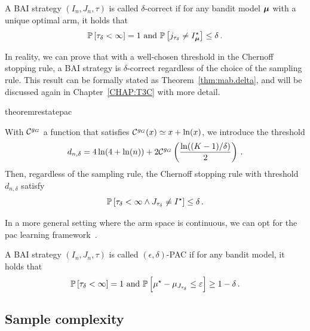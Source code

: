 \begin{definition}\label{def:mab.delta}
\begin{leftbar}[defnbar]
A BAI strategy $(I_n,J_n,\tau)$ is called $\delta$-correct if for any bandit model ${\boldsymbol \mu}$ with a unique optimal arm, it holds that
\[
	\mathbb{P}\left[\tau_\delta < \infty\right] = 1 \text{ and } \mathbb{P}\left[j_{\tau_\delta}\neq I_{{\boldsymbol \mu}}^{\star}\right] \leq \delta\,.
\]
\end{leftbar}
\end{definition}

In reality, we can prove that with a well-chosen threshold in the Chernoff stopping rule, a BAI strategy is $\delta$-correct regardless of the choice of the sampling rule. This result can be formally stated as Theorem~\ref{thm:mab.delta}, and will be discussed again in Chapter~\ref{CHAP:T3C} with more detail.

\begin{restatable}{theorem}{restatepac}\label{thm:mab.delta}
\begin{leftbar}[theorembar]
With $\mathcal{C}^{g_G}$ a function that satisfies $\mathcal{C}^{g_G}(x) \simeq x+\ln(x)$, we introduce the threshold
\begin{equation}
    d_{n,\delta} = 4\ln(4+\ln(n)) + 2 \mathcal{C}^{g_G}\left(\frac{\ln((K-1)/\delta)}{2}\right)\,.\label{def:mab.threshold_d}
\end{equation}
Then, regardless of the sampling rule, the Chernoff stopping rule with threshold $d_{n,\delta}$ satisfy 
\[ 
    \mathbb{P}\left[\tau_{\delta} < \infty \wedge J_{\tau_{\delta}} \neq I^\star\right] \leq \delta\,.
\]
\end{leftbar}
\end{restatable}

In a more general setting where the arm space is continuous, we can opt for the \gls{pac} learning framework~\citep{valiant1984pac}.

\begin{definition}\label{def:mab.pac}
\begin{leftbar}[defnbar]
A BAI strategy $(I_n,J_n,\tau)$ is called $(\epsilon,\delta)$-PAC if for any bandit model, it holds that
\[
	\mathbb{P}\left[\tau_\delta < \infty\right] = 1 \text{ and } \mathbb{P}\left[\mu^\star-\mu_{J_{\tau_\delta}}\leq \varepsilon\right] \geq 1-\delta\,.
\]
\end{leftbar}
\end{definition}

\subsection{Sample complexity}\label{sec:mab.performance.sample}


